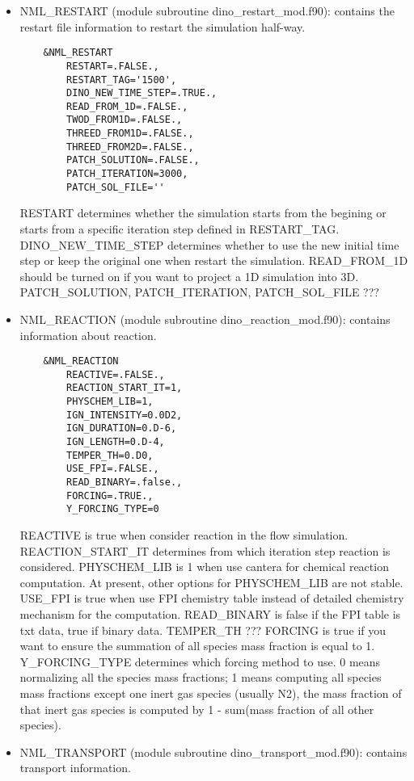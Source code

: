\begin{itemize}
  \item NML\_RESTART (module subroutine dino\_restart\_mod.f90): contains the restart file information to restart the simulation half-way.
  \begin{lstlisting}
    &NML_RESTART
        RESTART=.FALSE.,
        RESTART_TAG='1500',
        DINO_NEW_TIME_STEP=.TRUE.,
        READ_FROM_1D=.FALSE.,
        TWOD_FROM1D=.FALSE.,
        THREED_FROM1D=.FALSE.,
        THREED_FROM2D=.FALSE.,
        PATCH_SOLUTION=.FALSE.,
        PATCH_ITERATION=3000,
        PATCH_SOL_FILE=''
  \end{lstlisting}
  RESTART determines whether the simulation starts from the begining or starts from a specific iteration step defined in RESTART\_TAG. DINO\_NEW\_TIME\_STEP determines whether to use the new initial time step or keep the original one when restart the simulation. READ\_FROM\_1D should be turned on if you want to project a 1D simulation into 3D. PATCH\_SOLUTION, PATCH\_ITERATION, PATCH\_SOL\_FILE ???
  \item NML\_REACTION (module subroutine dino\_reaction\_mod.f90): contains information about reaction.
  \begin{lstlisting}
    &NML_REACTION
        REACTIVE=.FALSE.,
        REACTION_START_IT=1,
        PHYSCHEM_LIB=1,
        IGN_INTENSITY=0.0D2,
        IGN_DURATION=0.D-6,
        IGN_LENGTH=0.D-4,
        TEMPER_TH=0.D0,
        USE_FPI=.FALSE.,
        READ_BINARY=.false.,
        FORCING=.TRUE.,
        Y_FORCING_TYPE=0
  \end{lstlisting}
  REACTIVE is true when consider reaction in the flow simulation. REACTION\_START\_IT determines from which iteration step reaction is considered. PHYSCHEM\_LIB is 1 when use cantera for chemical reaction computation. At present, other options for PHYSCHEM\_LIB are not stable. USE\_FPI is true when use FPI chemistry table instead of detailed chemistry mechanism for the computation. READ\_BINARY is false if the FPI table is txt data, true if binary data. TEMPER\_TH ??? FORCING is true if you want to ensure the summation of all species mass fraction is equal to 1. Y\_FORCING\_TYPE determines which forcing method to use. 0 means normalizing all the species mass fractions; 1 means computing all species mass fractions except one inert gas species (usually N2), the mass fraction of that inert gas species is computed by 1 - sum(mass fraction of all other species).
  \item NML\_TRANSPORT (module subroutine dino\_transport\_mod.f90): contains transport information.
  \begin{lstlisting}

\end{lstlisting}
\end{itemize}
